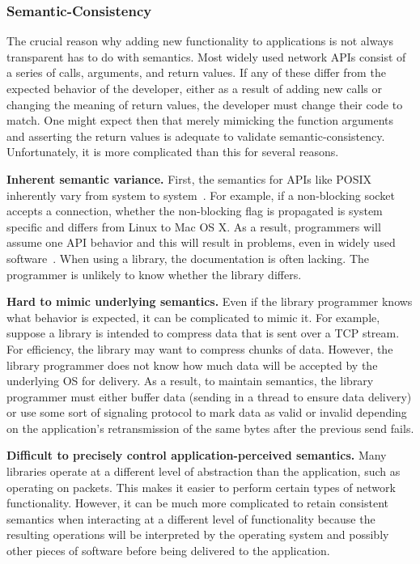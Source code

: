 \subsubsection{Semantic-Consistency}
\label{sec-semantic-consistency}
The crucial reason why adding new functionality to applications is not always transparent has to do with semantics.   Most widely used network APIs consist of a series of calls, arguments, and return values.   If any of these differ from the expected behavior of the developer, either as a result of adding new calls or changing the meaning of return values, the developer must change their code to match.   One might expect then that merely mimicking the function arguments and asserting the return values is adequate to validate semantic-consistency.  Unfortunately, it is more complicated than this for several reasons.   


{\bf Inherent semantic variance.} First, the semantics for APIs like
POSIX inherently vary from system to system~\cite{BSDLinuxDiff, 
demmer2007towards, CapposPythonBug1, NonBlockingDiff, BSDCompat, 
SOLINGERSemantics, REUSEADDRSemantics}.   For example, if a
non-blocking socket accepts a connection, whether the non-blocking flag is
propagated is system specific and differs from Linux to Mac OS X.   As a
result, programmers will assume one API behavior and this will result in 
problems, even in widely used software~\cite{CapposPythonBug1}.   When
using a library, the documentation is often lacking.   The 
programmer is unlikely to know whether the library differs.

{\bf Hard to mimic underlying semantics.} Even if the library programmer
knows what behavior is expected, it can be complicated to mimic it.   For
example, suppose a library is intended to compress data that is sent over a
TCP stream.   For efficiency, the library may want to compress chunks of
data.   However, the library programmer does not know how much data
will be accepted by the underlying OS for delivery.   As a result, to
maintain semantics, the library programmer must either buffer data (sending
in a thread to ensure data delivery) or use some sort of signaling protocol
to mark data as valid or invalid depending on the application's
retransmission of the same bytes after the previous send fails.   

{\bf Difficult to precisely control application-perceived semantics.}
Many libraries operate at a different level of abstraction than the
application, such as operating on packets.   This makes it easier to
perform certain types of network functionality.   However, it can be much
more complicated to retain consistent semantics when interacting at a
different level of functionality because the resulting operations will be
interpreted by the operating system and possibly other pieces of software
before being delivered to the application.

